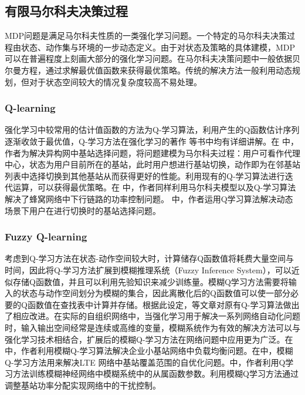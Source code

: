 ﻿\documentclass[11pt,draftclsnofoot,onecolumn,journal,letterpaper]{IEEEtran}
\begin{document}

\subsection{有限马尔科夫决策过程}
MDP问题是满足马尔科夫性质的一类强化学习问题。一个特定的马尔科夫决策过程由状态、动作集与环境的一步动态定义。由于对状态及策略的具体建模，MDP可以在普遍程度上刻画大部分的强化学习问题。在马尔科夫决策问题中一般依据贝尔曼方程，通过求解最优值函数来获得最优策略。传统的解决方法一般利用动态规划，但对于状态空间较大的情况复杂度较高不易处理。

\subsubsection{Q-learning}
强化学习中较常用的估计值函数的方法为Q-学习算法，利用产生的Q函数估计序列逐渐收敛于最优值，Q-学习方法在强化学习的著作
\cite{Sutton2016}等书中均有详细讲解。在\cite{Simsek2015} 中，作者为解决异构网中基站选择问题，将问题建模为马尔科夫过程：用户可看作代理中心，状态为用户目前所在的基站，此时用户想进行基站切换，动作即为在邻基站列表中选择切换到其他基站从而获得更好的性能。利用现有的Q-学习算法进行迭代运算，可以获得最优策略。在
\cite{Ghadimi2017} 中，作者同样利用马尔科夫模型以及Q-学习算法解决了蜂窝网络中下行链路的功率控制问题。
\cite{Dhahri2012}中，作者运用Q学习算法解决动态场景下用户在进行切换时的基站选择问题。

\subsubsection{Fuzzy Q-learning}
考虑到Q-学习方法在状态-动作空间较大时，计算储存Q函数值将耗费大量空间与时间，因此将Q-学习方法扩展到模糊推理系统（Fuzzy Inference System），可以近似存储Q函数值，并且可以利用先验知识来减少训练量。模糊Q学习方法需要将输入的状态与动作空间划分为模糊的集合，因此离散化后的Q函数值可以使一部分必要的Q函数值在查找表中计算并存储。根据此设定，\cite{Glorennec1997}等文章对原有Q-学习算法做出了相应改进。在实际的自组织网络中，当强化学习用于解决一系列网络自动化问题时，输入输出空间经常是连续或高维的变量，模糊系统作为有效的解决方法可以与强化学习技术相结合，扩展后的模糊Q-学习方法在网络问题中应用更为广泛。在
\cite{Munoz2013} 中，作者利用模糊Q-学习算法解决企业小基站网络中负载均衡问题。在\cite{Razavi2010}中，模糊Q-学习方法用来解决LTE 网络中基站覆盖范围的自优化问题。\cite{Fan2014}中，作者利用Q学习方法训练模糊神经网络中模糊系统中的从属函数参数。\cite{Dirani2010}利用模糊Q学习方法通过调整基站功率分配实现网络中的干扰控制。
\end{document}
